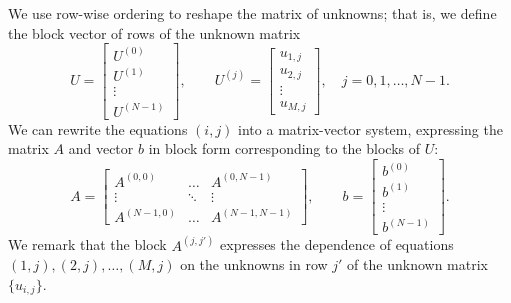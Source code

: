 \documentclass{homework}
\begin{document}
\begin{alphaparts}
		We use row-wise ordering to reshape the matrix of unknowns; that is, we define the block vector of rows of the unknown matrix
		\begin{equation*}
			U = \left[\begin{matrix}U^{(0)} \\ U^{(1)} \\ \vdots \\ U^{(N-1)}\end{matrix}\right], \qquad U^{(j)} = \left[\begin{matrix}u_{1,j} \\ u_{2,j} \\ \vdots \\ u_{M,j}\end{matrix}\right], \quad j =0,1,\dots, N-1.
		\end{equation*}
		We can rewrite the equations $(i,j)$ into a matrix-vector system, expressing the matrix $A$ and vector $b$ in block form corresponding to the blocks of $U$:
		\begin{equation*}
			A = \left[\begin{matrix}A^{(0,0)} &\hdots& A^{(0,N-1)} \\\vdots &\ddots & \vdots \\ A^{(N-1,0)} & \hdots & A^{(N-1,N-1)}\end{matrix}\right], \qquad b = \left[\begin{matrix}b^{(0)} \\ b^{(1)} \\ \vdots \\ b^{(N-1)}\end{matrix}\right].
		\end{equation*}
		We remark that the block $A^{(j,j')}$ expresses the dependence of equations $(1,j), (2,j), \dots, (M,j)$ on the unknowns in row $j'$ of the unknown matrix $\{u_{i,j}\}$. 
		

\end{alphaparts}
\end{document}
